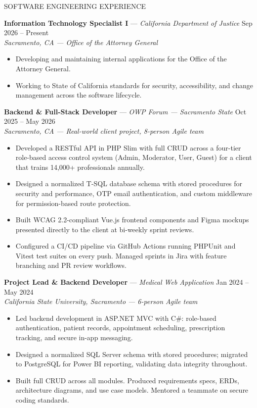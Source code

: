 \documentclass{resume}
\begin{document}
\begin{rSection}{SOFTWARE ENGINEERING EXPERIENCE}

\textbf{Information Technology Specialist I} --- \textit{California Department of Justice} \hfill Sep 2026 -- Present \\
\textit{Sacramento, CA --- Office of the Attorney General}
\begin{itemize}
    \item Developing and maintaining internal applications for the Office of the Attorney General.
    \item Working to State of California standards for security, accessibility, and change management across the software lifecycle.
\end{itemize}

\textbf{Backend \& Full-Stack Developer} --- \textit{OWP Forum --- Sacramento State} \hfill Oct 2025 -- May 2026 \\
\textit{Sacramento, CA --- Real-world client project, 8-person Agile team}
\begin{itemize}
    \item Developed a RESTful API in PHP Slim with full CRUD across a four-tier role-based access control system (Admin, Moderator, User, Guest) for a client that trains 14,000+ professionals annually.
    \item Designed a normalized T-SQL database schema with stored procedures for security and performance, OTP email authentication, and custom middleware for permission-based route protection.
    \item Built WCAG 2.2-compliant Vue.js frontend components and Figma mockups presented directly to the client at bi-weekly sprint reviews.
    \item Configured a CI/CD pipeline via GitHub Actions running PHPUnit and Vitest test suites on every push. Managed sprints in Jira with feature branching and PR review workflows.
\end{itemize}

\textbf{Project Lead \& Backend Developer} --- \textit{Medical Web Application} \hfill Jan 2024 -- May 2024 \\
\textit{California State University, Sacramento --- 6-person Agile team}
\begin{itemize}
    \item Led backend development in ASP.NET MVC with C\#: role-based authentication, patient records, appointment scheduling, prescription tracking, and secure in-app messaging.
    \item Designed a normalized SQL Server schema with stored procedures; migrated to PostgreSQL for Power BI reporting, validating data integrity throughout.
    \item Built full CRUD across all modules. Produced requirements specs, ERDs, architecture diagrams, and use case models. Mentored a teammate on secure coding standards.
\end{itemize}


\end{rSection}
\end{document}
